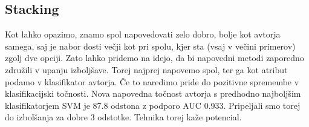 \documentclass[a4paper,11pt]{article}
\begin{document}
\subsection{Stacking}

Kot lahko opazimo, znamo spol napovedovati zelo dobro, bolje kot avtorja samega, saj je nabor dosti večji kot pri spolu, kjer sta (vsaj v večini primerov) 
zgolj dve opciji. Zato lahko pridemo na idejo, da bi napovedni metodi zaporedno združili v upanju izboljšave. Torej najprej napovemo spol, ter ga kot atribut podamo v klasifikator avtorja. Če to naredimo pride do pozitivne spremembe v klasifikacijski točnosti. Nova napovedna točnost avtorja s predhodno najboljšim  klasifikatorjem SVM je 87.8 odstona z podporo AUC 0.933. Pripeljali smo torej do izbolšanja za dobre 3 odstotke. Tehnika torej kaže potencial.
\end{document}
